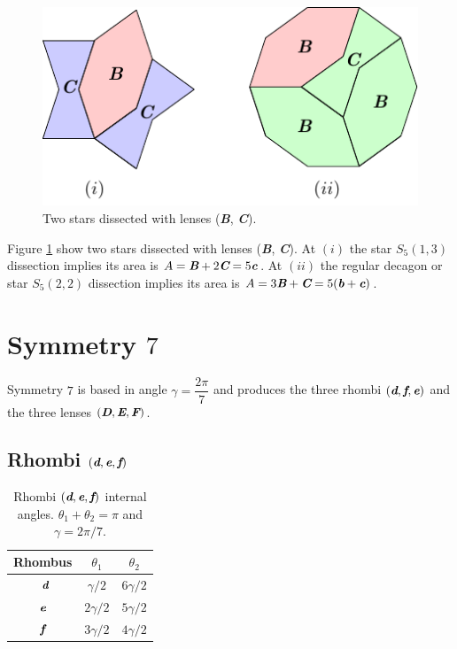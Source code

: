 \documentclass[11pt]{article}
\def\mathbi#1{\textbf{\em #1}}
\begin{document}
\begin{figure}[H]
\centering
\includegraphics[scale=1.1]{bc/bc-stars-2}
\caption{Two stars dissected with lenses (\mathbi{B}, \mathbi{C}).}
\label{fig:bc-stars-2}
\end{figure}

Figure \ref{fig:bc-stars-2} show two stars dissected with lenses (\mathbi{B}, \mathbi{C}).
At $(i)$ the star $S_5(1,3)$ dissection implies its area is $A = \mathbi{B} + 2\mathbi{C} = 5\mathbi{c}$.
At $(ii)$ the regular decagon or star $S_5(2,2)$ dissection implies its area is $A = 3\mathbi{B} + \mathbi{C} = 5(\mathbi{b} + \mathbi{c})$.



\section{Symmetry $7$}

Symmetry $7$ is based in angle $\gamma = \dfrac{2\pi}7$ and produces the three rhombi $(\mathbi{d},\mathbi{f},\mathbi{e})$ and the three lenses $(\mathbi{D},\mathbi{E},\mathbi{F})$.

\subsection{Rhombi $(\mathbi{d},\mathbi{e},\mathbi{f})$}

\begin{table}[H]
\begin{center}
\begin{tabular}{|c|c c|} \hline
Rhombus & $\theta_1$ & $\theta_2$ \\ \hline\
$\mathbi{d}$ & $\gamma/2$ & $6\gamma/2$ \\[0.5ex] \hline
$\mathbi{e}$ & $2\gamma/2$ & $5\gamma/2$ \\[0.5ex] \hline
$\mathbi{f}$ & $3\gamma/2$ & $4\gamma/2$ \\[0.5ex] \hline
\end{tabular}
\caption{Rhombi $(\mathbi{d},\mathbi{e},\mathbi{f})$ internal angles. $\theta_1 + \theta_2 = \pi$ and $\gamma = 2\pi/7$.} 
\label{tbl:def-angles}
\end{center}
\end{table}
\end{document}
